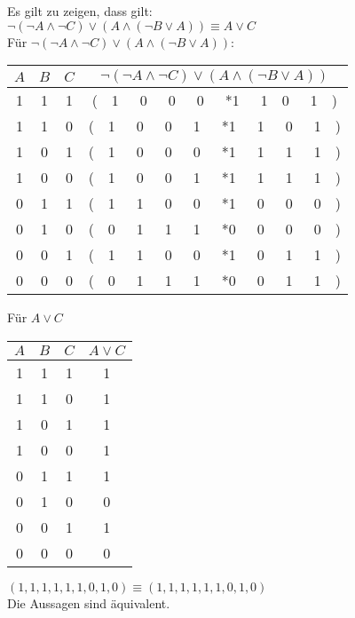 Es gilt zu zeigen, dass gilt: \\
$\lnot ( \lnot A \land \lnot C ) \lor ( A \land (\lnot B \lor A)) \equiv A \lor C$\\

Für $\lnot ( \lnot A \land \lnot C ) \lor ( A \land (\lnot B \lor A)) $:\\
\begin{center}
\begin{tabular}[h]{c|c|c|c}
 $A$ & $B$ & $C$ &  $\lnot ( \lnot A \land \lnot C ) \lor ( A \land (\lnot B \lor A))$ \\ 
 \hline
 1 & 1 & 1 & (~~1~~~0~~~0~~~0~~~*1~~~1~~0~~~1~~)\\
 1 & 1 & 0 & (~~1~~~0~~~0~~~1~~~*1~~~1~~~0~~~1~~)\\
 1 & 0 & 1 & (~~1~~~0~~~0~~~0~~~*1~~~1~~~1~~~1~~)\\
 1 & 0 & 0 & (~~1~~~0~~~0~~~1~~~*1~~~1~~~1~~~1~~)\\
 0 & 1 & 1 & (~~1~~~1~~~0~~~0~~~*1~~~0~~~0~~~0~~)\\
 0 & 1 & 0 & (~~0~~~1~~~1~~~1~~~*0~~~0~~~0~~~0~~)\\
 0 & 0 & 1 & (~~1~~~1~~~0~~~0~~~*1~~~0~~~1~~~1~~)\\
 0 & 0 & 0 & (~~0~~~1~~~1~~~1~~~*0~~~0~~~1~~~1~~)\\

\end{tabular}
\end{center}
\vspace{2cm}

Für $A \lor C$
\begin{center}
	\begin{tabular}[h]{c|c|c|c}
		$A$ & $B$ &  $C$ & $A \lor C$ \\ 
		\hline
		1 & 1 & 1 & 1\\
		1 & 1 & 0 & 1\\
		1 & 0 & 1 & 1\\
		1 & 0 & 0 & 1\\
		0 & 1 & 1 & 1\\
		0 & 1 & 0 & 0\\
		0 & 0 & 1 & 1\\
		0 & 0 & 0 & 0\\
	\end{tabular}
\end{center}

\vspace{1cm}
$ \left(1,1,1,1,1,1,0,1,0\right) \equiv \left(1,1,1,1,1,1,0,1,0\right) $\\
Die Aussagen sind äquivalent.